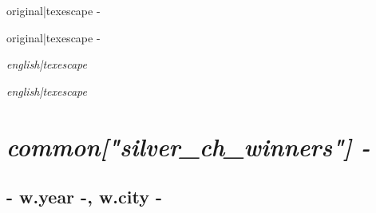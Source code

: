 {%

{%
{%
{\large {{ original|texescape -}} } 
{%
{%
\begin{addmargin}[-0.05em]{0em}{\large {{ original|texescape -}} }\end{addmargin}{\itshape {{ english|texescape }} }
{%
\begin{addmargin}[-0.05em]{0em}{\large{ } }\end{addmargin}{\itshape {{ english|texescape }} }
{%
{\large{} } 
{%
{%
{%

{%
{%
{%
{%
{%
{%
{%
{%
{%
{%

{%
\chapter*{\hfill{\slshape {{ common["silver_ch_winners"] -}} } }
\thispagestyle{empty}
\vspace{70pt}
{%
{%
    \section*{ {{- w.year -}}, {{ w.city -}} }
{%
}}}}}}}}}}}}}}}}}}}}}}}}
